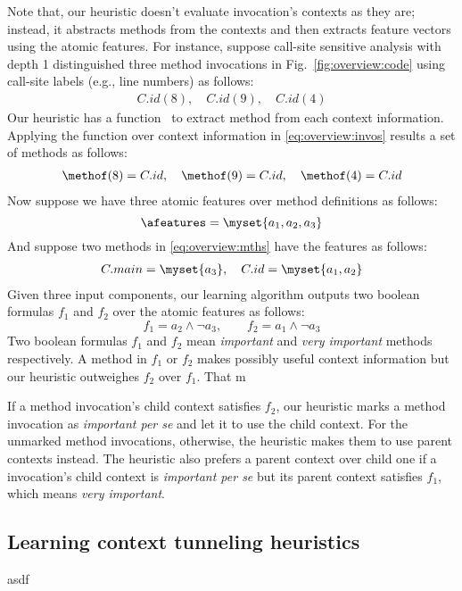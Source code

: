 Note that, our heuristic doesn't evaluate invocation's contexts as they are; instead, it abstracts methods from the contexts and then extracts feature vectors using the atomic features. For instance, suppose call-site sensitive analysis with depth 1 distinguished three method invocations in Fig.~\ref{fig:overview:code} using call-site labels (e.g., line numbers) as follows:
\begin{align}\label{eq:overview:invos}
C.id(8),\quad C.id(9),\quad C.id(4)
\end{align}
Our heuristic has a function \methof~to extract method from each context information. Applying the function over context information in \ref{eq:overview:invos} results a set of methods as follows:
\begin{align}\label{eq:overview:mths}
\methof(8)=C.id, \quad \methof(9)=C.id, \quad \methof(4)=C.id
\end{align}
Now suppose we have three atomic features over method definitions as follows:
\[
\afeatures=\myset{a_1, a_2, a_3}
\]
And suppose two methods in \ref{eq:overview:mths} have the features as follows:
\begin{align}
  C.main=\myset{a_3}, \quad C.id=\myset{a_1, a_2}
\end{align}
Given three input components, our learning algorithm outputs two boolean formulas $f_1$ and $f_2$ over the atomic features as follows:
\[
f_1=a_2\wedge \neg a_3, \qquad f_2=a_1 \wedge \neg a_3
\]
Two boolean formulas $f_1$ and $f_2$ mean \emph{important} and \emph{very important} methods respectively. A method in $f_1$ or $f_2$ makes possibly useful context information but our heuristic outweighes $f_2$ over $f_1$. That m

If a method invocation's child context satisfies $f_2$, our heuristic marks a method invocation as \emph{important per se} and let it to use the child context. For the unmarked method invocations, otherwise, the heuristic makes them to use parent contexts instead. The heuristic also prefers a parent context over child one if a invocation's child context is \emph{important per se} but its parent context satisfies $f_1$, which means \emph{very important}. 

\subsection{Learning context tunneling heuristics}
asdf 
